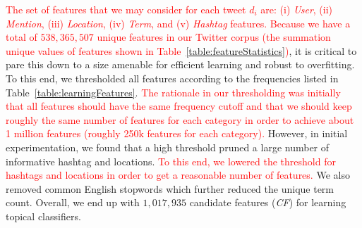 \textcolor{red}{The set of features that we may consider for each tweet $d_i$ are: (i) \textit{User}, (ii) \textit{Mention}, (iii) \textit{Location}, (iv) \textit{Term}, and (v) \textit{Hashtag} features.}
%
\textcolor{red}{Because we have a total of $538,365,507$ unique features in our
Twitter corpus (the summation unique values of features shown in Table~\ref{table:featureStatistics})}, it is critical to pare this down to a size amenable
for efficient learning and robust to overfitting.  To this end, we
thresholded all features according to the frequencies listed in
Table~\ref{table:learningFeatures}.  
\textcolor{red}{The rationale in our thresholding was initially that all features should have the same frequency cutoff and that we should keep roughly the same number of features for each category in order to achieve about 1 million features (roughly 250k features for each category).}  However, in  initial experimentation, we found that a high threshold pruned a large number of informative hashtag and locations.  \textcolor{red}{To this end, we lowered the threshold for hashtags and locations in order to get a reasonable number of features.}  We also removed common English stopwords which further reduced the unique term count.  Overall, we end up with $1,017,935$ candidate features (\textit{CF}) for learning topical classifiers.


